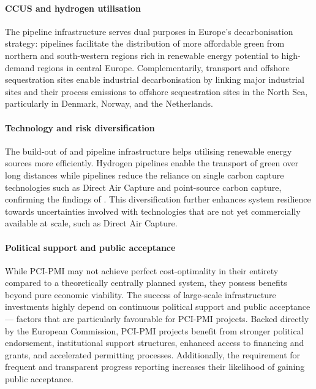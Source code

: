 \documentclass[preprint,12pt,sort&compress]{elsarticle}
\begin{document}
\paragraph{CCUS and hydrogen utilisation}
The pipeline infrastructure serves dual purposes in Europe's decarbonisation strategy:  pipelines facilitate the distribution of more affordable green  from northern and south-western regions rich in renewable energy potential to high-demand regions in central Europe. Complementarily,  transport and offshore sequestration sites enable industrial decarbonisation by linking major industrial sites and their process emissions to offshore sequestration sites in the North Sea, particularly in Denmark, Norway, and the Netherlands.

\paragraph{Technology and risk diversification}
The build-out of  and  pipeline infrastructure helps utilising renewable energy sources more efficiently. Hydrogen pipelines enable the transport of green  over long distances while  pipelines reduce the reliance on single carbon capture technologies such as Direct Air Capture and point-source carbon capture, confirming the findings of \cite{hofmannH2CO2Network2025}. This diversification further enhances system resilience towards uncertainties involved with technologies that are not yet commercially available at scale, such as Direct Air Capture.

\paragraph{Political support and public acceptance} 
While PCI-PMI may not achieve perfect cost-optimality in their entirety compared to a theoretically centrally planned system, they possess benefits beyond pure economic viability. The success of large-scale infrastructure investments highly depend on continuous political support and public acceptance --- factors that are particularly favourable for PCI-PMI projects.
Backed directly by the European Commission, PCI-PMI projects benefit from stronger political endorsement, institutional support structures, enhanced access to financing and grants, and accelerated permitting processes. Additionally, the requirement for frequent and transparent progress reporting increases their likelihood of gaining public acceptance.
\end{document}
